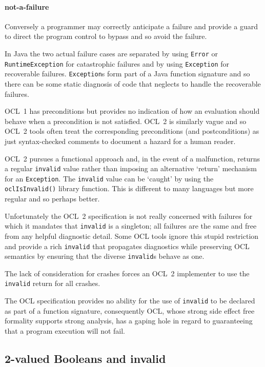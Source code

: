 \documentclass{jot}
\begin{document}
\paragraph{not-a-failure} Conversely a programmer may correctly anticipate a failure and provide a guard to direct the program control to bypass and so avoid the failure. 

In Java the two actual failure cases are separated by using \verb$Error$ or \verb$RuntimeException$ for catastrophic failures and by using \verb$Exception$ for recoverable failures. \verb$Exception$s form part of a Java function signature and so there can be some static diagnosis of code that neglects to handle the recoverable failures.

OCL~1 has preconditions but provides no indication of how an evaluation should behave when a precondition is not satisfied. OCL~2 is similarly vague and so OCL~2 tools often treat the corresponding preconditions (and postconditions) as just syntax-checked comments to document a hazard for a human reader.

OCL~2 pursues a functional approach and, in the event of a malfunction, returns a regular \verb$invalid$ value rather than imposing an alternative `return' mechanism for an \verb$Exception$. The \verb$invalid$ value can be `caught' by using the \verb$oclIsInvalid()$ library function. This is different to many languages but more regular and so perhaps better.

Unfortunately the OCL~2 specification is not really concerned with failures for which it mandates that \verb$invalid$ is a singleton; all failures are the same and free from any helpful diagnostic detail. Some OCL tools ignore this stupid restriction and provide a rich \verb$invalid$ that propagates diagnostics while preserving OCL semantics by ensuring that the diverse \verb$invalid$s behave as one.

The lack of consideration for crashes forces an OCL~2 implementer to use the \verb$invalid$ return for all crashes.%

The OCL specification provides no ability for the use of \verb$invalid$ to be declared as part of a function signature, consequently OCL, whose strong side effect free formality supports strong analysis, has a gaping hole in regard to guaranteeing that a program execution will not fail.

\subsection{2-valued Booleans and invalid}
\end{document}
